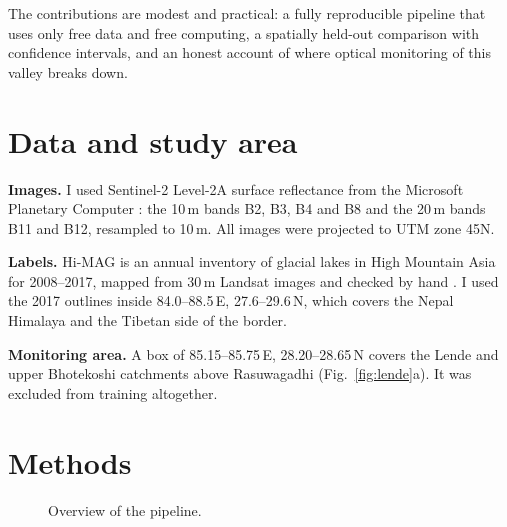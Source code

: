 \documentclass[11pt,a4paper]{article}
\begin{document}
The contributions are modest and practical: a fully reproducible pipeline that uses only free data and free computing, a spatially held-out comparison with confidence intervals, and an honest account of where optical monitoring of this valley breaks down.

\section{Data and study area}

\textbf{Images.} I used Sentinel-2 Level-2A surface reflectance \cite{maink2017} from the Microsoft Planetary Computer \cite{pc2022}: the 10\,m bands B2, B3, B4 and B8 and the 20\,m bands B11 and B12, resampled to 10\,m. All images were projected to UTM zone 45N.

\textbf{Labels.} Hi-MAG is an annual inventory of glacial lakes in High Mountain Asia for 2008--2017, mapped from 30\,m Landsat images and checked by hand \cite{chen2021}. I used the 2017 outlines inside 84.0--88.5\,E, 27.6--29.6\,N, which covers the Nepal Himalaya and the Tibetan side of the border.

\textbf{Monitoring area.} A box of 85.15--85.75\,E, 28.20--28.65\,N covers the Lende and upper Bhotekoshi catchments above Rasuwagadhi (Fig.~\ref{fig:lende}a). It was excluded from training altogether.

\section{Methods}

\begin{figure}[H]
\centering
{}
\caption{Overview of the pipeline.}
\label{fig:pipeline}
\end{figure}
\end{document}
